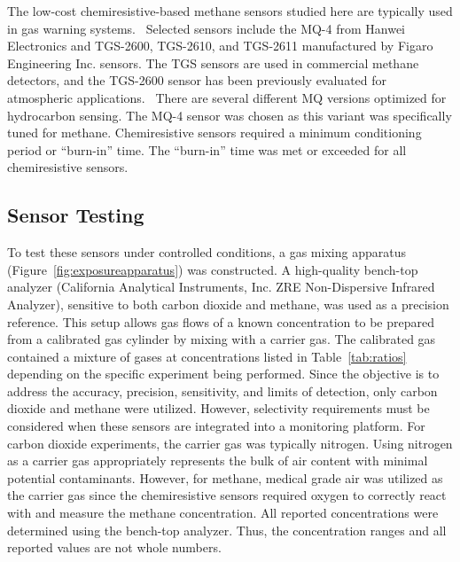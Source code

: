 \documentclass[times]{joehreview}
\begin{document}
	The low-cost chemiresistive-based methane sensors studied here are typically used in gas warning systems.~\cite{chiu_towards_2013}  Selected sensors include the MQ-4 from Hanwei Electronics and TGS-2600, TGS-2610, and TGS-2611 manufactured by Figaro Engineering Inc. sensors.  The TGS sensors are used in commercial methane detectors, and the TGS-2600 sensor has been previously evaluated for atmospheric applications.~\cite{eugster_performance_2012,bossche_potential_2017}  There are several different MQ versions optimized for hydrocarbon sensing.  The MQ-4 sensor was chosen as this variant was specifically tuned for methane.  Chemiresistive sensors required a minimum conditioning period or ``burn-in'' time.  The ``burn-in'' time was met or exceeded for all chemiresistive sensors.  
	
	\subsection*{Sensor Testing }
	To test these sensors under controlled conditions, a gas mixing apparatus (Figure~\ref{fig:exposureapparatus}) was constructed.  A high-quality bench-top analyzer (California Analytical Instruments, Inc. ZRE Non-Dispersive Infrared Analyzer), sensitive to both carbon dioxide and methane, was used as a precision reference. This setup allows gas flows of a known concentration to be prepared from a calibrated gas cylinder by mixing with a carrier gas.  The calibrated gas contained a mixture of gases at concentrations listed in Table~\ref{tab:ratios} depending on the specific experiment being performed.  Since the objective is to address the accuracy, precision, sensitivity, and limits of detection, only carbon dioxide and methane were utilized.  However, selectivity requirements must be considered when these sensors are integrated into a monitoring platform.  For carbon dioxide experiments, the carrier gas was typically nitrogen.  Using nitrogen as a carrier gas appropriately represents the bulk of air content with minimal potential contaminants.  However, for methane, medical grade air was utilized as the carrier gas since the chemiresistive sensors required oxygen to correctly react with and measure the methane concentration.  All reported concentrations were determined using the bench-top analyzer.  Thus, the concentration ranges and all reported values are not whole numbers.	  
	
\end{document}
